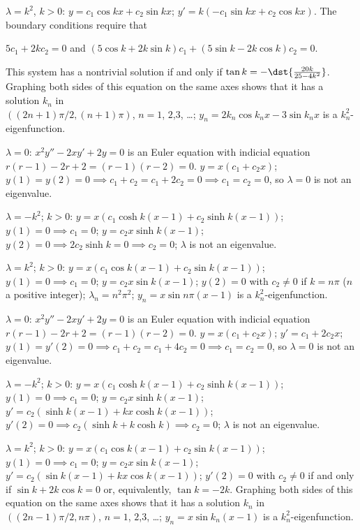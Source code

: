\documentclass[dvips]{book}
\renewcommand{\exer}[1]{\par\medskip\;\noindent{\color{red}\bf #1.}}
\numberwithin{example}{section}
\numberwithin{equation}{section}
\numberwithin{theorem}{section}
\numberwithin{table}{section}
\numberwithin{figure}{section}
\begin{document}
$\lambda=k^{2}$, $k>0$:
 $y=c_{1}\cos kx+c_{2}\sin kx$; $y'=k(-c_{1}\sin kx+c_{2}\cos
kx)$.  The boundary conditions require that \\
\centerline{$5c_{1}+2kc_{2}=0$ \; and  \;
$(5\cos k+2k\sin k)c_{1}+(5\sin k-2k\cos k)c_{2}=0$.}
\noindent
This system has  a   nontrivial solution if and only if
 $\tan k =-\dst{\frac{20k}{25-4k^{2}}}$.
 Graphing
both sides of this equation on the same axes shows that it has
a solution $k_{n}$ in\\ $((2n+1)\pi/2,(n+1)\pi)$, $n=1$, $2$,$3$,
\dots;
$y_{n}=2k_{n} \cos k_{n}x-3\sin k_{n}x$ is a $k_{n}^{2}$-eigenfunction.



\exer{13.2.22}
$\lambda=0$: $x^{2}y''-2xy'+2y=0$ is an Euler equation
with indicial equation
$r(r-1)-2r+2=(r-1)(r-2)=0$. $y=x(c_{1}+c_{2}x)$; $y(1)=y(2)=0\implies
c_{1}+c_{2}=c_{1}+2c_{2}=0\implies c_{1}=c_{2}=0$, so $\lambda=0$
is not an eigenvalue.

$\lambda=-k^{2}$; $k>0$:
$y=x(c_{1}\cosh k(x-1)+c_{2}\sinh k(x-1))$; $y(1)=0\implies c_{1}=0$;
$y=c_{2}x\sinh k(x-1)$; $y(2)=0\implies 2c_{2}\sinh k=0\implies c_{2}=0$;
$\lambda$ is not an eigenvalue.


$\lambda=k^{2}$; $k>0$:
$y=x(c_{1}\cos k(x-1)+c_{2}\sin k(x-1))$; $y(1)=0\implies c_{1}=0$;
$y=c_{2}x\sin k(x-1)$; $y(2)=0$ with $c_{2}\ne0$ if $k=n\pi$
($n$ a positive integer); $\lambda_{n}=n^{2}\pi^{2}$;
 $y_{n}=x\sin n\pi(x-1)$ is a $k_{n}^{2}$-eigenfunction.



\exer{13.2.24}
$\lambda=0$: $x^{2}y''-2xy'+2y=0$ is an Euler equation
with indicial equation
$r(r-1)-2r+2=(r-1)(r-2)=0$. $y=x(c_{1}+c_{2}x)$; $y'=c_{1}+2c_{2}x$;
$y(1)=y'(2)=0\implies c_{1}+c_{2}=c_{1}+4c_{2}=0\implies c_{1}=c_{2}=0$,
 so $\lambda=0$  is  not an eigenvalue.


$\lambda=-k^{2}$; $k>0$:
$y=x(c_{1}\cosh k(x-1)+c_{2}\sinh k(x-1))$; $y(1)=0\implies c_{1}=0$;
$y=c_{2}x\sinh k(x-1)$; $y'=c_{2}
(\sinh k(x-1)+kx\cosh k(x-1))$;
 $y'(2)=0\implies c_{2}(\sinh k+k\cosh k)\implies c_{2}=0$;
$\lambda$ is not an eigenvalue.


$\lambda=k^{2}$; $k>0$:
$y=x(c_{1}\cos k(x-1)+c_{2}\sin k(x-1))$; $y(1)=0\implies c_{1}=0$;
$y=c_{2}x\sin k(x-1)$;
$y'=c_{2}(\sin k(x-1)+kx\cos k(x-1))$;
 $y'(2)=0$ with $c_{2}\ne0$ if and only if $\sin k+2k\cos k=0$ or,
equivalently,
$\tan k=-2k$.
 Graphing
both sides of this equation on the same axes shows that it has
a  solution $k_{n}$ in $((2n-1)\pi/2,n\pi)$, $n=1$, $2$,$3$,
\dots;
 $y_{n}=x\sin k_{n}(x-1)$ is a $k_{n}^{2}$-eigenfunction.
\end{document}
